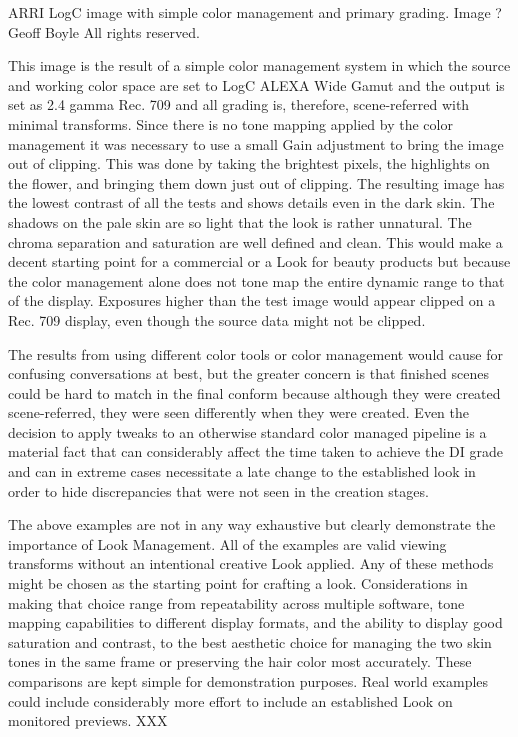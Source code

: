 ARRI LogC image with simple color management and primary grading.  Image ? Geoff Boyle All rights reserved.

This image is the result of a simple color management system in which the source and working color space are set to LogC ALEXA Wide Gamut and the output is set as 2.4 gamma Rec. 709 and all grading is, therefore, scene-referred with minimal transforms. Since there is no tone mapping applied by the color management it was necessary to use a small Gain adjustment to bring the image out of clipping. This was done by taking the brightest pixels, the highlights on the flower, and bringing them down just out of clipping. The resulting image has the lowest contrast of all the tests and shows details even in the dark skin. The shadows on the pale skin are so light that the look is rather unnatural. The chroma separation and saturation are well defined and clean. This would make a decent starting point for a commercial or a Look for beauty products but because the color management alone does not tone map the entire dynamic range to that of the display. Exposures higher than the test image would appear clipped on a Rec. 709 display, even though the source data might not be clipped.

The results from using different color tools or color management would cause for confusing conversations at best, but the greater concern is that finished scenes could be hard to match in the final conform because although they were created scene-referred, they were seen differently when they were created. Even the decision to apply tweaks to an otherwise standard color managed pipeline is a material fact that can considerably affect the time taken to achieve the DI grade and can in extreme cases necessitate a late change to the established look in order to hide discrepancies that were not seen in the creation stages.

The above examples are not in any way exhaustive but clearly demonstrate the importance of Look Management. All of the examples are valid viewing transforms without an intentional creative Look applied. Any of these methods might be chosen as the starting point for crafting a look. Considerations in making that choice range from repeatability across multiple software, tone mapping capabilities to different display formats, and the ability to display good saturation and contrast, to the best aesthetic choice for managing the two skin tones in the same frame or preserving the hair color most accurately. These comparisons are kept simple for demonstration purposes. Real world examples could include considerably more effort to include an established Look on monitored previews.
XXX

